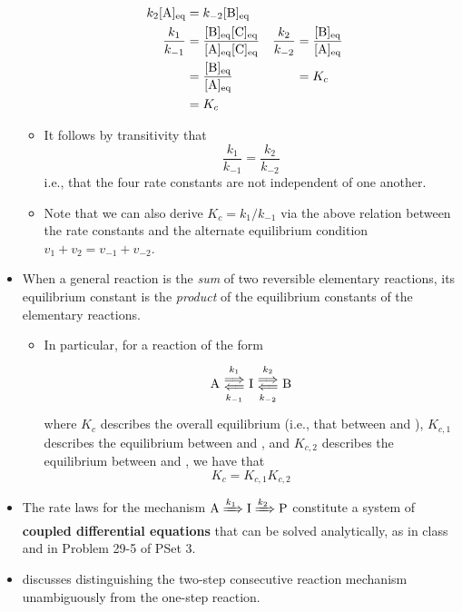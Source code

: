 \documentclass[../notes.tex]{subfiles}
\begin{document}
\begin{itemize}
\begin{itemize}
\begin{align*}
                k_2\cnc[eq]{A} &= k_{-2}\cnc[eq]{B}\\
            \frac{k_1}{k_{-1}} &= \frac{\cnc[eq]{B}\cnc[eq]{C}}{\cnc[eq]{A}\cnc[eq]{C}}&
                \frac{k_2}{k_{-2}} &= \frac{\cnc[eq]{B}}{\cnc[eq]{A}}\\
            &= \frac{\cnc[eq]{B}}{\cnc[eq]{A}}&
                &= K_c\\
            &= K_c
        \end{align*}
        \item It follows by transitivity that
        \begin{equation*}
            \frac{k_1}{k_{-1}} = \frac{k_2}{k_{-2}}
        \end{equation*}
        i.e., that the four rate constants are not independent of one another.
        \item Note that we can also derive $K_c=k_1/k_{-1}$ via the above relation between the rate constants and the alternate equilibrium condition $v_1+v_2=v_{-1}+v_{-2}$.
    \end{itemize}
    \item When a general reaction is the \emph{sum} of two reversible elementary reactions, its equilibrium constant is the \emph{product} of the equilibrium constants of the elementary reactions.
    \begin{itemize}
        \item In particular, for a reaction of the form
        \begin{equation*}
            \ce{A} \Longleftrightarrows[k_1][k_{-1}] \ce{I} \Longleftrightarrows[k_2][k_{-2}] \ce{B}
        \end{equation*}
        where $K_c$ describes the overall equilibrium (i.e., that between  and ), $K_{c,1}$ describes the equilibrium between  and , and $K_{c,2}$ describes the equilibrium between  and , we have that
        \begin{equation*}
            K_c = K_{c,1}K_{c,2}
        \end{equation*}
    \end{itemize}
    \item The rate laws for the mechanism $\ce{A}\xRightarrow{k_1}\ce{I}\xRightarrow{k_2}\ce{P}$ constitute a system of \textbf{coupled differential equations} that can be solved analytically, as in class and in Problem 29-5 of PSet 3.
    \item \textcite{bib:McQuarrieSimon} discusses distinguishing the two-step consecutive reaction mechanism unambiguously from the one-step reaction.

\end{itemize}
\end{document}

